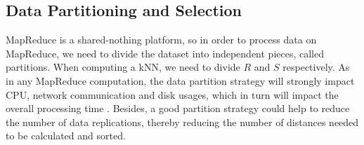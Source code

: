 
\subsection{Data Partitioning and Selection}
\label{partitioning}
MapReduce is a shared-nothing platform, so in order to process data on MapReduce, we need to divide the dataset into independent pieces, 
called partitions. When computing a kNN, we need to divide $R$ and $S$ respectively.
As in any MapReduce computation, the data partition strategy will strongly impact CPU, network communication and disk usages, which in turn will impact the overall processing time \cite{DBLP:conf/hpcc/SongMHMYL13}. Besides, a good partition strategy could help to reduce the number of data replications, thereby reducing the number of distances needed to be calculated and sorted.

